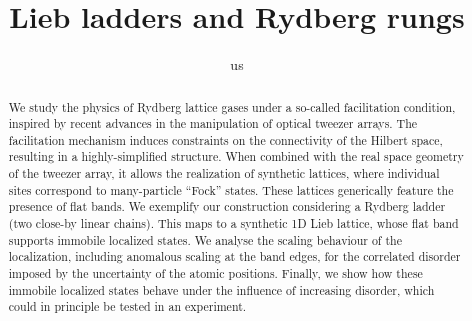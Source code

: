 \documentclass[prl,aps,twocolumn,showpacs,superscriptaddress,longbibliography]{revtex4-1}
\begin{document}
\title{Lieb ladders and Rydberg rungs}

\author{us}



\begin{abstract}
We study the physics of Rydberg lattice gases under a so-called facilitation condition, inspired by recent advances in the manipulation of optical tweezer arrays. The facilitation mechanism induces constraints on the connectivity of the Hilbert space, resulting in a highly-simplified structure. When combined with the real space geometry of the tweezer array, it allows the realization of synthetic lattices, where individual sites correspond to many-particle ``Fock'' states. These lattices generically feature the presence of flat bands. We exemplify our construction considering a Rydberg ladder (two close-by linear chains). This maps to a synthetic 1D Lieb lattice, whose flat band supports immobile localized states. We analyse the scaling behaviour of the localization, including anomalous scaling at the band edges, for the correlated disorder imposed by the uncertainty of the atomic positions. Finally, we show how these immobile localized states behave under the influence of increasing disorder, which could in principle be tested in an experiment. 
\end{abstract}
\pacs{}
\maketitle
\end{document}
